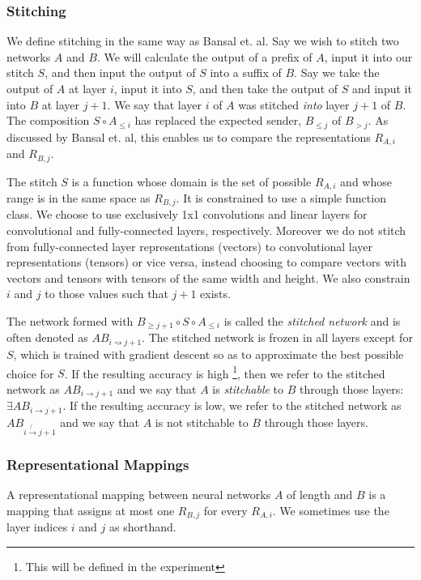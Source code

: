 \documentclass{article} %
\begin{document}
\subsubsection*{Stitching}
We define stitching in the same way as Bansal et. al. 
Say we wish to stitch two networks \(A\) and \(B\).
We will calculate the output of a prefix of \(A\),
input it into our stitch \(S\), and then input the output
of \(S\) into a suffix of \(B\). Say we take the
output of \(A\) at layer \(i\), input it into \(S\),
and then take the output of \(S\) and input it into
\(B\) at layer \(j+1\). We say that layer \(i\) of
\(A\) was stitched \emph{into} layer \(j+1\) of \(B\).
The composition \(S \circ A_{\leq i}\) has replaced
the expected sender, \(B_{\leq j}\) of \(B_{>j}\).
As discussed by Bansal et. al, this enables us to compare
the representations \(R_{A,i}\) and \(R_{B,j}\).

The stitch \(S\) is a function whose domain is the set of possible \(R_{A,i}\)
and whose range is in the same space as \(R_{B,j}\). It is constrained to use a simple
function class. We choose to use exclusively 1x1 convolutions and linear layers for
convolutional and fully-connected layers, respectively. Moreover we do not stitch from
fully-connected layer representations (vectors) to convolutional layer representations (tensors)
or vice versa, instead choosing to compare vectors with vectors and tensors with tensors of
the same width and height. We also constrain \(i\) and \(j\) to those values such
that \(j+1\) exists.

The network formed with \(B_{\geq j+1} \circ S \circ A_{\leq i}\) is called the 
\emph{stitched network} and is often denoted as \(AB_{i \rightsquigarrow j+1}\). The stitched 
network is frozen in all layers except for \(S\), which is trained with gradient descent
so as to approximate the best possible choice for \(S\). If the resulting accuracy
is high
\footnote{This will be defined in the experiment}, 
then we refer to the stitched network as \(AB_{i \rightarrow j+1}\) and we say
that \(A\) is \emph{stitchable} to \(B\) through those layers: \(\exists AB_{i \rightarrow j+1}\).
If the resulting accuracy is low, we refer to the stitched network as \(AB_{i \not{\rightarrow} j+1}\)
and we say that \(A\) is not stitchable to \(B\) through those layers.

\subsubsection*{Representational Mappings}
A representational mapping between neural networks \(A\) of length and \(B\) is a mapping that assigns
at most one \(R_{B,j}\) for every \(R_{A,i}\). We sometimes use the layer indices \(i\) and \(j\)
as shorthand.
\end{document}
